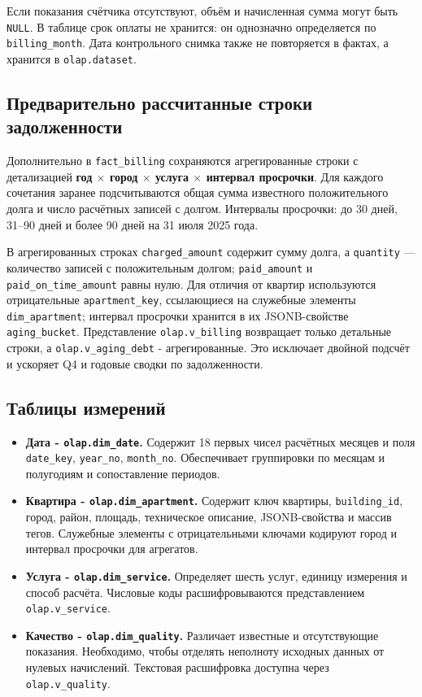 \documentclass[12pt]{article}
\begin{document}
Если показания счётчика отсутствуют, объём и начисленная сумма могут быть \texttt{NULL}. В таблице срок оплаты не хранится: он однозначно определяется по \texttt{billing\_month}. Дата контрольного снимка также не повторяется в фактах, а хранится в \texttt{olap.dataset}.

\subsection{Предварительно рассчитанные строки задолженности}
Дополнительно в \texttt{fact\_billing} сохраняются агрегированные строки с детализацией \textbf{год $\times$ город $\times$ услуга $\times$ интервал просрочки}. Для каждого сочетания заранее подсчитываются общая сумма известного положительного долга и число расчётных записей с долгом. Интервалы просрочки: до 30 дней, 31--90 дней и более 90 дней на 31 июля 2025 года.

В агрегированных строках \texttt{charged\_amount} содержит сумму долга, а \texttt{quantity} --- количество записей с положительным долгом; \texttt{paid\_amount} и \texttt{paid\_on\_time\_amount} равны нулю. Для отличия от квартир используются отрицательные \texttt{apartment\_key}, ссылающиеся на служебные элементы \texttt{dim\_apartment}; интервал просрочки хранится в их JSONB-свойстве \texttt{aging\_bucket}. Представление \texttt{olap.v\_billing} возвращает только детальные строки, а \texttt{olap.v\_aging\_debt} - агрегированные. Это исключает двойной подсчёт и ускоряет Q4 и годовые сводки по задолженности.


\subsection{Таблицы измерений}
\begin{itemize}
    \item \textbf{Дата - \texttt{olap.dim\_date}.} Содержит 18 первых чисел расчётных месяцев и поля \texttt{date\_key}, \texttt{year\_no}, \texttt{month\_no}. Обеспечивает группировки по месяцам и полугодиям и сопоставление периодов.
    \item \textbf{Квартира - \texttt{olap.dim\_apartment}.} Содержит ключ квартиры, \texttt{building\_id}, город, район, площадь, техническое описание, JSONB-свойства и массив тегов. Служебные элементы с отрицательными ключами кодируют город и интервал просрочки для агрегатов.
    \item \textbf{Услуга - \texttt{olap.dim\_service}.} Определяет шесть услуг, единицу измерения и способ расчёта. Числовые коды расшифровываются представлением \texttt{olap.v\_service}.
    \item \textbf{Качество - \texttt{olap.dim\_quality}.} Различает известные и отсутствующие показания. Необходимо, чтобы отделять неполноту исходных данных от нулевых начислений. Текстовая расшифровка доступна через \texttt{olap.v\_quality}.
\end{itemize}
\end{document}
